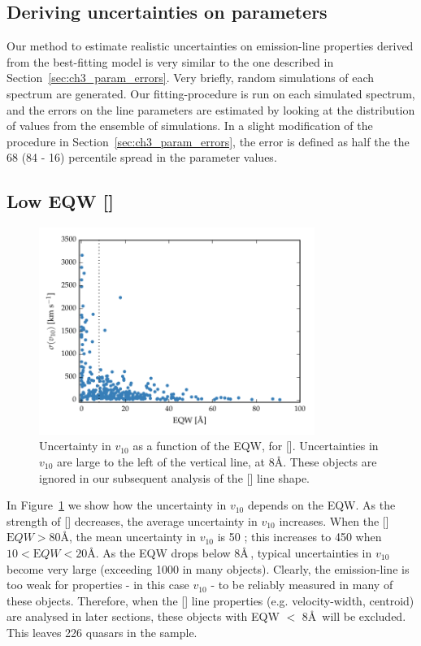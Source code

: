 \subsection{Deriving uncertainties on parameters}

Our method to estimate realistic uncertainties on emission-line properties derived from the best-fitting model is very similar to the one described in Section~\ref{sec:ch3_param_errors}. 
Very briefly, random simulations of each spectrum are generated.
Our fitting-procedure is run on each simulated spectrum, and the errors on the line parameters are estimated by looking at the distribution of values from the ensemble of simulations. 
In a slight modification of the procedure in Section~\ref{sec:ch3_param_errors}, the error is defined as half the the 68 (84 - 16) percentile spread in the parameter values. 

\subsection{Low EQW []}

\begin{figure}
    \centering
    \includegraphics[width=0.8\textwidth]{figures/chapter04/eqw_cut.pdf} 
    \caption[{Uncertainty in $v_{10}$ as a function of the EQW, for [].}]{Uncertainty in $v_{10}$ as a function of the EQW, for []. Uncertainties in $v_{10}$ are large to the left of the vertical line, at 8\AA. These objects are ignored in our subsequent analysis of the [] line shape.}     
    \label{fig:eqw_cut}
\end{figure}

In Figure~\ref{fig:eqw_cut} we show how the uncertainty in $v_{10}$ depends on the EQW. 
As the strength of [] decreases, the average uncertainty in $v_{10}$ increases.
When the [] ${\mathrm EQW} > 80$\AA, the mean uncertainty in $v_{10}$ is 50 \kms; this increases to 450 \kms when $10 < {\mathrm EQW} < 20$\AA. 
As the EQW drops below 8\AA\,, typical uncertainties in $v_{10}$ become very large (exceeding 1000 \kms in many objects). 
Clearly, the emission-line is too weak for properties - in this case $v_{10}$ - to be reliably measured in many of these objects. 
Therefore, when the [] line properties (e.g. velocity-width, centroid) are analysed in later sections, these objects with EQW $<$ 8\AA\, will be excluded. 
This leaves 226 quasars in the sample. 

